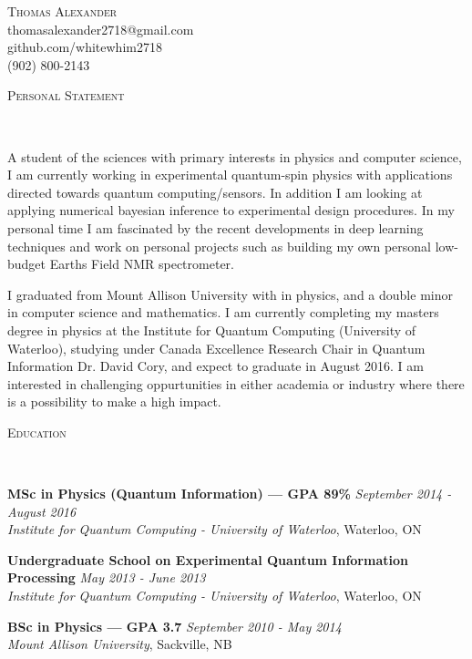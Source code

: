 \documentclass[9pt]{article}
\newenvironment{changemargin}[2]{%
  \begin{list}{}{%
    \setlength{\topsep}{0pt}%
    \setlength{\leftmargin}{#1}%
    \setlength{\rightmargin}{#2}%
    \setlength{\listparindent}{\parindent}%
    \setlength{\itemindent}{\parindent}%
    \setlength{\parsep}{\parskip}%
  }%
  \item[]}{\end{list}
}
\newcommand{\lineover}{
	\begin{changemargin}{-0.05in}{-0.05in}
		\vspace*{-8pt}
		\hrulefill \\
		\vspace*{-2pt}
	\end{changemargin}
}
\newcommand{\header}[1]{
	\begin{changemargin}{-0.5in}{-0.5in}
		\scshape{#1}\\
  	\lineover
	\end{changemargin}
}
\newcommand{\contact}[4]{
	\begin{changemargin}{-0.5in}{-0.5in}
		\begin{center}
			{\Large \scshape {#1}}\\ \smallskip
			{#2}\\ \smallskip 
			{#4}\\ \smallskip
			{#3}\smallskip
		\end{center}
	\end{changemargin}
}
\newenvironment{body} {
	\vspace*{-16pt}
	\begin{changemargin}{-0.25in}{-0.5in}
  }	
	{\end{changemargin}
}
\begin{document}
\contact{Thomas Alexander}{thomasalexander2718@gmail.com}{(902) 800-2143}{github.com/whitewhim2718}


\header{Personal Statement}

\begin{body}
	\vspace{14pt}
	A student of the sciences with primary interests in physics and computer science, I am currently working in experimental quantum-spin physics with applications directed towards quantum computing/sensors. In addition I am looking at applying numerical bayesian inference to experimental design procedures. In my personal time I am fascinated by the recent developments in deep learning techniques and work on personal projects such as building my own personal low-budget Earths Field NMR spectrometer. 

	I graduated from Mount Allison University with  in physics, and a double minor in computer science and mathematics. I am  currently completing my masters degree in physics at the Institute for Quantum Computing (University of Waterloo), studying under Canada Excellence Research Chair in Quantum Information Dr. David Cory, and expect to graduate in August 2016. I am interested in challenging oppurtunities in either academia or industry where there is a possibility to make a high impact.

\end{body}
\smallskip


\header{Education}
\begin{body}
	\vspace{14pt}
	\textbf{MSc in Physics (Quantum Information) --- GPA 89\% }{} \hfill \emph{September 2014 - August 2016}{} \\
	\emph{Institute for Quantum Computing - University of Waterloo}, Waterloo, ON{} \\
  
\end{body}
\begin{body}
	\vspace{14pt}
	\textbf{Undergraduate School on Experimental Quantum Information Processing}{} \hfill \emph{May 2013 - June 2013}{} \\
	\emph{Institute for Quantum Computing - University of Waterloo}, Waterloo, ON{} \\
  
\end{body}
\begin{body}
	\vspace{14pt}
	\textbf{BSc in Physics --- GPA 3.7 }{} \hfill \emph{September 2010 - May 2014}{} \\
	\emph{Mount Allison University}, Sackville, NB{} \\
  
\end{body}
\end{document}

